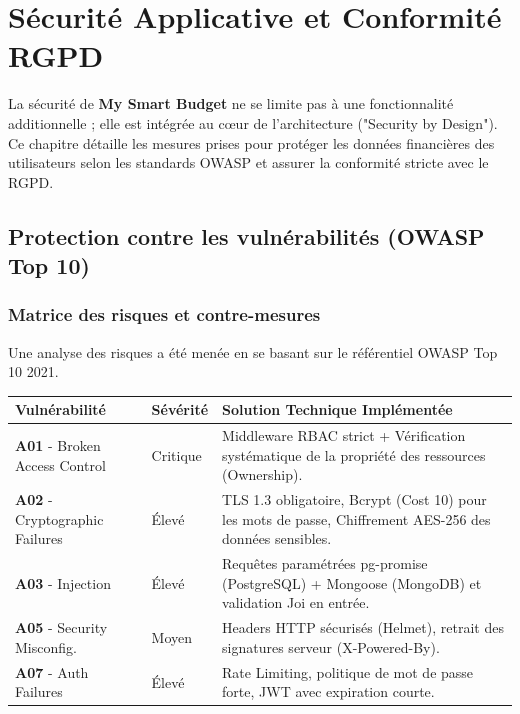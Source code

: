 \chapter{Sécurité Applicative et Conformité RGPD}

La sécurité de \textbf{My Smart Budget} ne se limite pas à une fonctionnalité additionnelle ; elle est intégrée au cœur de l'architecture ("Security by Design"). Ce chapitre détaille les mesures prises pour protéger les données financières des utilisateurs selon les standards OWASP et assurer la conformité stricte avec le RGPD.

\section{Protection contre les vulnérabilités (OWASP Top 10)}



\subsection{Matrice des risques et contre-mesures}

Une analyse des risques a été menée en se basant sur le référentiel OWASP Top 10 2021.

\begin{tcolorbox}[colback=red!5!white,colframe=red!60!black,title=\textbf{Couverture des risques critiques}]
\small
\begin{tabular}{|p{}|p{}|p{}|}
\hline
\textbf{Vulnérabilité} & \textbf{Sévérité} & \textbf{Solution Technique Implémentée} \\
\hline
\textbf{A01} - Broken Access Control & Critique & Middleware RBAC strict + Vérification systématique de la propriété des ressources (Ownership). \\
\hline
\textbf{A02} - Cryptographic Failures & Élevé & TLS 1.3 obligatoire, Bcrypt (Cost 10) pour les mots de passe, Chiffrement AES-256 des données sensibles. \\
\hline
\textbf{A03} - Injection & Élevé & Requêtes paramétrées pg-promise (PostgreSQL) + Mongoose (MongoDB) et validation Joi en entrée. \\
\hline
\textbf{A05} - Security Misconfig. & Moyen & Headers HTTP sécurisés (Helmet), retrait des signatures serveur (X-Powered-By). \\
\hline
\textbf{A07} - Auth Failures & Élevé & Rate Limiting, politique de mot de passe forte, JWT avec expiration courte. \\
\hline
\end{tabular}
\end{tcolorbox}

